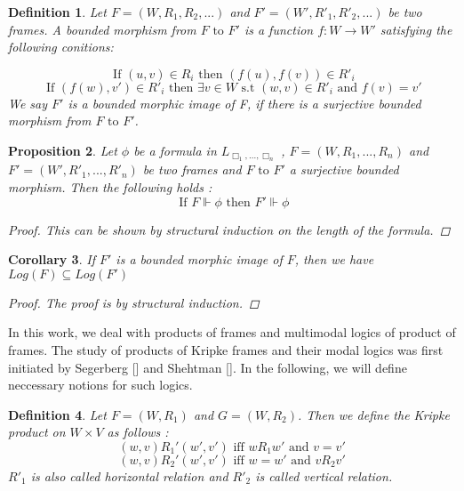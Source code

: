 \documentclass[12pt, a4paper]{scrartcl}
\newtheorem{definition}{Definition}[subsection]
\newtheorem{proposition}[definition]{Proposition}
\newtheorem{corollary}[definition]{Corollary}
\begin{document}
\begin{definition}
    Let $F = (W,R_1, R_2, ...)$ and $F' = (W', R'_1, R'_2, ...)$ be two frames. A bounded morphism from $F \mbox{ to } F'$ is a function
    $f : W \rightarrow W'$ satisfying the following conitions: 
    
    $$ \mbox{ If } (u,v) \in R_i  \mbox{ then }(f(u), f(v)) \in R'_i $$
    $$ \mbox{ If } (f(w), v') \in R'_i \mbox{ then } \exists v \in W \mbox{ s.t } (w,v) \in R'_i \mbox{ and } f(v) = v'$$
    We say $F'$ is a bounded morphic image of F, if there is a surjective bounded morphism from $F \mbox{ to } F'$.
        
\end{definition}

\begin{proposition}
    Let $\phi$ be a formula in $L_{\Box_1,...,\Box_n}$ , $F = (W, R_1,...,R_n)$ and $F' = (W', R'_1,...,R'_n)$ be two frames and $F \mbox{ to } F'$ a surjective bounded morphism. Then the following holds :
    $$ \mbox{ If }F \Vdash \phi \mbox{ then } F' \Vdash \phi$$
    \begin{proof}
            This can be shown by structural induction on the length of the formula.
    \end{proof}
        
\end{proposition}

\begin{corollary}
    If $F'$ is a bounded morphic image of $F$, then we have $Log(F) \subseteq Log(F')$
    \begin{proof}
        The proof is by structural induction.
        
    \end{proof}
    
\end{corollary}

In this work, we deal with products of frames and multimodal logics of product of frames. The study of products of Kripke frames 
and their modal logics was first initiated by Segerberg [] and Shehtman []. In the following, we will define neccessary notions for such logics.

\begin{definition}
    Let $F = (W, R_1)$ and $G = (W,R_2)$. Then we define the Kripke product on $W \times V$ as follows : 
    $$(w,v)R_1'(w',v') \mbox{ iff } wR_1w' \mbox{ and } v = v'$$
    $$(w,v)R_2  '(w',v') \mbox{ iff } w = w' \mbox{ and } vR_2v'$$
    $R'_1$ is also called horizontal relation and $R'_2$ is called vertical relation.
\end{definition}
\end{document}
